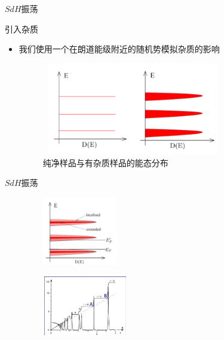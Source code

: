 \documentclass{beamer}
\begin{document}
\begin{frame}{$SdH$振荡}
	\begin{block}{引入杂质}
		\begin{itemize}
			\item 我们使用一个在朗道能级附近的随机势模拟杂质的影响
			\begin{figure}[H]
				\begin{center}
					\includegraphics[width=8cm,height=4cm]{pic/7.png}
					\caption{纯净样品与有杂质样品的能态分布\cite{meng2018integer}}
				\end{center}
			\end{figure}
		\end{itemize}
	\end{block}
\end{frame}
\begin{frame}{$SdH$振荡}
		\begin{figure}[H]
		\begin{center}
			\includegraphics[width=4.5cm,height=3cm]{pic/8.png}
		\end{center}
	\end{figure}
	\begin{figure}[H]
	\begin{center}
		\includegraphics[width=5cm,height=2.6cm]{pic/4.jpg}
	\end{center}
\end{figure}
\end{frame}
\end{document}

